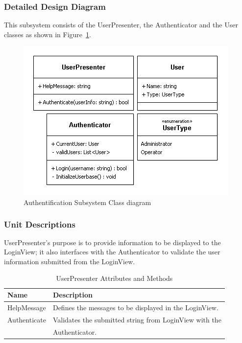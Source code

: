 \documentclass[12pt]{article}
\begin{document}
\subsubsection{Detailed Design Diagram}
This subsystem consists of the UserPresenter, the Authenticator and the User classes as shown in Figure~\ref{fig:AuthentificationSubsystemClassDiagram}. 
\begin{figure}[h!]
    \centering
    \includegraphics[scale=1]{3_2_1_authentificationsubsystem}
    \caption{Authentification Subsystem Class diagram}
    \label{fig:AuthentificationSubsystemClassDiagram}
\end{figure}

\subsubsection{Unit Descriptions}

\vspace*{0.2in}
\vspace*{0.15in}
UserPresenter’s purpose is to provide information to be displayed to the LoginView; it also interfaces with the Authenticator to validate the user information submitted from the LoginView. 
\clearpage
\begin{table}[ht]
\centering
   \begin{tabular}{|l|l|}
        \hline
        {\large Name} & {\large Description} \\
        \hline\hline
        HelpMessage & Defines the messages to be displayed in the LoginView.\\
        \hline
        Authenticate & Validates the submitted string from LoginView with the\\
        & Authenticator.\\
        \hline
    \end{tabular}
\caption{UserPresenter Attributes and Methods}
\end{table}
\end{document}

